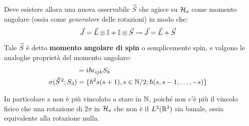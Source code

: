 \documentclass[../../FisicaTeorica.tex]{subfiles}
\begin{document}
 Deve esistere allora una nuova osservabile $\vec{S}$ che agisce su $\mathcal{H}_s$ come momento angolare (ossia come \textit{generatore} delle rotazioni) in modo che:
\[
\vec{J}=\vec{L}\otimes \mathbb{I} + \mathbb{I}\otimes \vec{S} \rightsquigarrow \vec{J}=\vec{L}+\vec{S}
\]
Tale $\vec{S}$ è detto\textbf{ momento angolare di spin} o semplicemente spin, e valgono le analoghe proprietà del momento angolare: 
\begin{align*}
[S_i, S_j]&=i\hbar \epsilon_{ijk}S_k\\
\sigma(\vec{S}^{\,2}; S_3)&= \{\hbar^2 s(s+1), s\in \bb{N}/2; \hbar (s,s-1, \dots, -s)\}
\end{align*}

In particolare $s$ non è più vincolato a stare in $\mathbb{N}$, poiché non c'è più il vincolo fisico che una rotazione di $2\pi$ in $\mathcal{H}_s$ che non è il  $L^2(\mathbb{R}^3)$ sia banale, ossia equivalente alla rotazione nulla.
\end{document}
